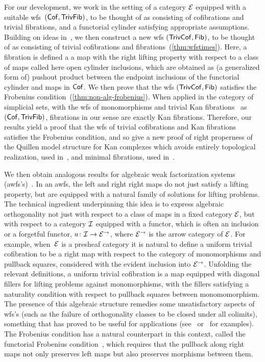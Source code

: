 \documentclass[reqno,10pt,a4paper,oneside,draft]{amsart}
\begin{document}
For our development, we work in the setting of a category $\cal{E}$ equipped with a suitable wfs~$(\Cof, \TrivFib)$, to be thought of as consisting of cofibrations and trivial fibrations, and a functorial cylinder satisfying appropriate assumptions. 
Building on ideas in~\cite{cisinski-asterisque}, we then construct a new wfs $(\TrivCof, \Fib)$, to be thought of as consisting of  trivial cofibrations and fibrations~(\cref{thm:wfstimes}). Here, a fibration is defined a a map with the right lifting property with respect to a class of maps called here open cylinder inclusions, which are obtained as (a generalized form of) pushout product between the endpoint inclusions of the functorial cylinder and maps in $\Cof$.  We then prove that the wfs $(\TrivCof, \Fib)$ satisfies the Frobenius condition~(\cref{thm:non-alg-frobenius}). 
When applied in the category of simplicial sets, with the wfs of monomorphisms and trivial Kan fibrations~\cite{quillen-homotopical} as $(\Cof, \TrivFib)$, fibrations in our sense are exactly Kan fibrations.
Therefore, our results yield a proof that the wfs of trivial cofibrations and Kan fibrations satisfies the Frobenius condition, and so give a new proof of right properness of the Quillen model structure for Kan complexes which avoids entirely topological realization, used in~\cite{hovey-model-categories}, and minimal fibrations, used in~\cite{joyal-tierney:simplicial-homotopy-theory}.

We then obtain analogous results for algebraic weak factorization systems (awfs's)~\cite{garner:small-object-argument,grandis-tholen-nwfs}.
In an awfs, the left and right right maps do not just satisfy a lifting property, but are equipped with a natural family of solutions for lifting problems.
The technical ingredient underpinning this idea is to express algebraic orthogonality not just with respect to a class of maps in a fixed category $\cal{E}$, but with respect to a category $\cal{I}$ equipped with a functor, which is often an inclusion or a forgetful functor, $u \co \cal{I} \to \cal{E}^\to$, where $\cal{E}^\to$ is the arrow category of $\cal{E}$.
For example, when~$\cal{E}$ is a presheaf category it is natural to define a uniform trivial cofibration to be a right map with respect to the category of monomorphisms and pullback squares, considered with the evident inclusion into $\cal{E}^\to$.
Unfolding the relevant definitions, a uniform trivial cofibration is a map equipped with diagonal fillers for lifting problems against monomorphisms, with the fillers satisfying a naturality condition with respect to pullback squares between monomomorphism.
The presence of this algebraic structure remedies some unsatisfactory aspects of wfs's (such as the failure of orthogonality classes to be closed under all colimits), something that has proved to be useful for applications (see~\cite{batanin-cisinski-weber,garner:globular-operator-awfs,garner-homomorphisms} or~\cite{awodey-cubical,coquand-cubical-sets,cohen-et-al:cubicaltt,pitts-cubical-nominal,swan-awfs} for examples).
The Frobenius condition has a natural counterpart in this context, called the functorial Frobenius condition~\cite{garner:topological-simplicial}, which requires that the pullback along right maps not only preserves left maps but also preserves morphisms between them.
\end{document}
